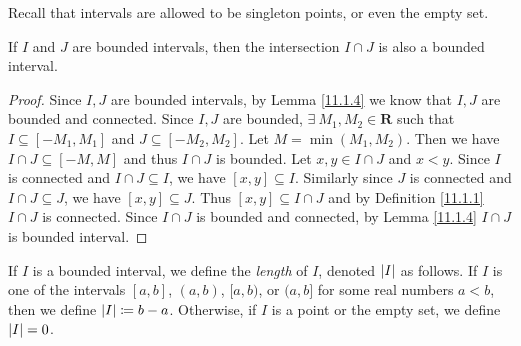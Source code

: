 \begin{remark}\label{11.1.5}
    Recall that intervals are allowed to be singleton points, or even the empty set.
\end{remark}

\begin{corollary}\label{11.1.6}
    If \(I\) and \(J\) are bounded intervals, then the intersection \(I \cap J\) is also a bounded interval.
\end{corollary}

\begin{proof}
    Since \(I, J\) are bounded intervals, by Lemma \ref{11.1.4} we know that \(I, J\) are bounded and connected.
    Since \(I, J\) are bounded, \(\exists\ M_1, M_2 \in \mathbf{R}\) such that \(I \subseteq [-M_1, M_1]\) and \(J \subseteq [-M_2, M_2]\).
    Let \(M = \min(M_1, M_2)\).
    Then we have \(I \cap J \subseteq [-M, M]\) and thus \(I \cap J\) is bounded.
    Let \(x, y \in I \cap J\) and \(x < y\).
    Since \(I\) is connected and \(I \cap J \subseteq I\), we have \([x, y] \subseteq I\).
    Similarly since \(J\) is connected and \(I \cap J \subseteq J\), we have \([x, y] \subseteq J\).
    Thus \([x, y] \subseteq I \cap J\) and by Definition \ref{11.1.1} \(I \cap J\) is connected.
    Since \(I \cap J\) is bounded and connected, by Lemma \ref{11.1.4} \(I \cap J\) is bounded interval.
\end{proof}

\setcounter{theorem}{7}
\begin{definition}\label{11.1.8}
    If \(I\) is a bounded interval, we define the \emph{length} of \(I\), denoted \(\abs*{I}\) as follows.
    If \(I\) is one of the intervals \([a, b]\), \((a, b)\), \([a, b)\), or \((a, b]\) for some real numbers \(a < b\), then we define \(\abs*{I} \coloneqq b - a\).
    Otherwise, if \(I\) is a point or the empty set, we define \(\abs*{I} = 0\).
\end{definition}
